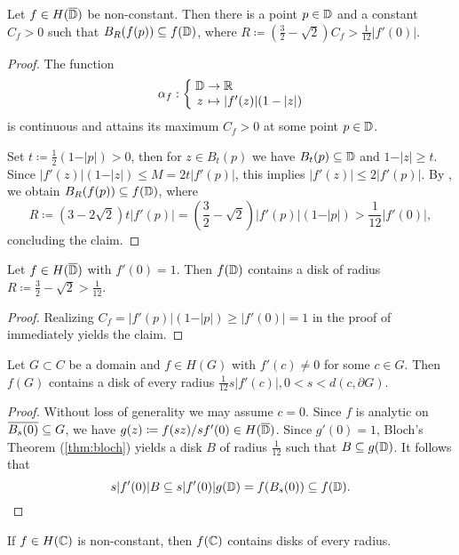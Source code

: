 \begin{theorem} \label{thm:bloch-stronger}
    Let $f \in H(\overline{\mathbb{D}})$ be non-constant. Then there is a point $p \in \mathbb{D}$ and a constant $C_f > 0$ such that $B_{R}(f(p)) \subseteq f(\mathbb{D})$, where $R \coloneqq (\frac{3}{2} - \sqrt{2}) C_f > \frac{1}{12} \vert f'(0) \vert$.
\end{theorem}

\begin{proof}
    The function
    $$ \mapping{\alpha_f}{\D & \to & \R}{z & \mapsto & \vert f'(z) \vert (1 - \vert z \vert)} $$
    is continuous and attains its maximum $C_f > 0$ at some point $p \in \mathbb{D}$.
    
    Set $t \coloneqq \frac{1}{2}(1 - \vert p \vert) > 0$, then for $z \in B_{t}(p)$ we have $B_{t}(p) \subseteq \mathbb{D}$ and $1 - \vert z \vert \geq t$. Since $\vert f'(z) \vert (1 - \vert z \vert) \leq M = 2 t \vert f'(p) \vert$, this implies $\vert f'(z) \vert \leq 2 \vert f'(p) \vert$. By , we obtain
    $ B_{R}(f(p)) \subseteq f(\mathbb{D}) $, where 
    $$ R \coloneqq (3 - 2 \sqrt{2}) t \vert f'(p) \vert = ({\textstyle \frac{3}{2}} - \sqrt{2}) \vert f'(p) \vert (1 - \vert p \vert) > {\textstyle \frac{1}{12}} \vert f'(0) \vert, $$
    concluding the claim.
\end{proof}

\begin{theorem}[Bloch] \label{thm:bloch}
    Let $f \in H(\overline{\mathbb{D}})$ with $f'(0) = 1$. Then $f(\mathbb{D})$ contains a disk of radius $R \coloneqq \frac{3}{2} - \sqrt{2} > \frac{1}{12}$.
\end{theorem}

\begin{proof}
    Realizing $C_f = \vert f'(p) \vert (1 - \vert p \vert) \geq \vert f'(0) \vert = 1$ in the proof of  immediately yields the claim.
\end{proof}

\begin{corollary} \label{cor:bloch-domain}
    Let $G \subset C$ be a domain and $f \in H(G)$ with $f'(c) \neq 0$ for some $c \in G$. Then $f(G)$ contains a disk of every radius $\frac{1}{12} s \vert f'(c) \vert, 0 < s < d(c, \partial G)$.
\end{corollary}

\begin{proof}
    Without loss of generality we may assume $c = 0$. Since $f$ is analytic on $\overline{B_s(0)} \subseteq G$, we have $g(z) \coloneqq f(sz) / sf'(0) \in H(\overline{\mathbb{D}})$. Since $g'(0) = 1$, Bloch's Theorem (\ref{thm:bloch}) yields a disk $B$ of radius $\frac{1}{12}$ such that $B \subseteq g(\mathbb{D})$. It follows that
    \begin{equation*}
        s \vert f'(0) \vert B \subseteq s \vert f'(0) \vert g(\mathbb{D}) = f(B_s(0)) \subseteq f(\mathbb{D}).
    \end{equation*}
\end{proof}

\begin{corollary} \label{cor:bloch-entire}
    If $f \in H(\mathbb{C})$ is non-constant, then $f(\mathbb{C})$ contains disks of every radius.
\end{corollary}